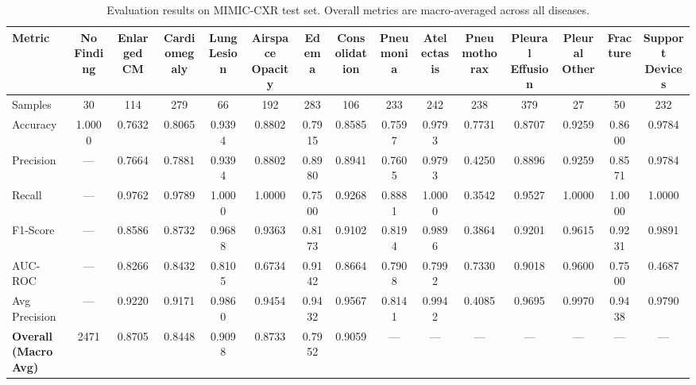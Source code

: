 \begin{table}[htbp]
\centering
\small
\begin{tabular}{lcccccccccccccc}
\toprule
Metric & No Finding & Enlarged CM & Cardiomegaly & Lung Lesion & Airspace Opacity & Edema & Consolidation & Pneumonia & Atelectasis & Pneumothorax & Pleural Effusion & Pleural Other & Fracture & Support Devices \\
\midrule
Samples & 30 & 114 & 279 & 66 & 192 & 283 & 106 & 233 & 242 & 238 & 379 & 27 & 50 & 232 \\
Accuracy & 1.0000 & 0.7632 & 0.8065 & 0.9394 & 0.8802 & 0.7915 & 0.8585 & 0.7597 & 0.9793 & 0.7731 & 0.8707 & 0.9259 & 0.8600 & 0.9784 \\
Precision & --- & 0.7664 & 0.7881 & 0.9394 & 0.8802 & 0.8980 & 0.8941 & 0.7605 & 0.9793 & 0.4250 & 0.8896 & 0.9259 & 0.8571 & 0.9784 \\
Recall & --- & 0.9762 & 0.9789 & 1.0000 & 1.0000 & 0.7500 & 0.9268 & 0.8881 & 1.0000 & 0.3542 & 0.9527 & 1.0000 & 1.0000 & 1.0000 \\
F1-Score & --- & 0.8586 & 0.8732 & 0.9688 & 0.9363 & 0.8173 & 0.9102 & 0.8194 & 0.9896 & 0.3864 & 0.9201 & 0.9615 & 0.9231 & 0.9891 \\
AUC-ROC & --- & 0.8266 & 0.8432 & 0.8105 & 0.6734 & 0.9142 & 0.8664 & 0.7908 & 0.7992 & 0.7330 & 0.9018 & 0.9600 & 0.7500 & 0.4687 \\
Avg Precision & --- & 0.9220 & 0.9171 & 0.9860 & 0.9454 & 0.9432 & 0.9567 & 0.8141 & 0.9942 & 0.4085 & 0.9695 & 0.9970 & 0.9438 & 0.9790 \\
\midrule
\textbf{Overall (Macro Avg)} & 2471 & 0.8705 & 0.8448 & 0.9098 & 0.8733 & 0.7952 & 0.9059 & --- & --- & --- & --- & --- & --- & --- \\
\bottomrule
\end{tabular}
\caption{Evaluation results on MIMIC-CXR test set. Overall metrics are macro-averaged across all diseases.}
\label{tab:evaluation_results}
\end{table}
